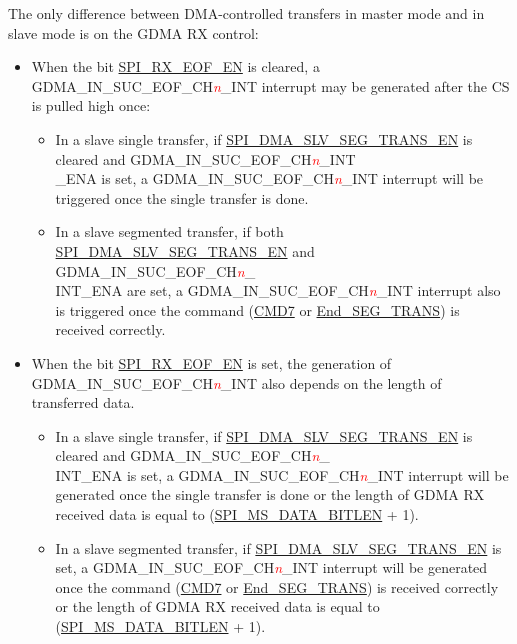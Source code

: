 \documentclass[main\_\_EN.tex]{subfiles}
\begin{document}
The only difference between DMA-controlled transfers in master mode and in slave mode is on the GDMA RX control:

\begin{itemize}
    \item When the bit \hyperref[fielddesc:SPIRXEOFEN]{SPI\_RX\_EOF\_EN} is cleared, a GDMA\_IN\_SUC\_EOF\_CH\textcolor{red}{\it{n}}\_INT interrupt may be generated after the CS is pulled high once:
        \begin{itemize}
            \item In a slave single transfer, if \hyperref[fielddesc:SPIDMASLVSEGTRANSEN]{SPI\_DMA\_SLV\_SEG\_TRANS\_EN} is cleared and GDMA\_IN\_SUC\_EOF\_CH\textcolor{red}{\it{n}}\_INT\\\_ENA is set, a GDMA\_IN\_SUC\_EOF\_CH\textcolor{red}{\it{n}}\_INT interrupt will be triggered once the single transfer is done.
            \item In a slave segmented transfer, if both \hyperref[fielddesc:SPIDMASLVSEGTRANSEN]{SPI\_DMA\_SLV\_SEG\_TRANS\_EN} and GDMA\_IN\_SUC\_EOF\_CH\textcolor{red}{\it{n}}\_\\INT\_ENA are set, a GDMA\_IN\_SUC\_EOF\_CH\textcolor{red}{\it{n}}\_INT interrupt also is triggered once the command (\hyperref[other:spi-item-cmd7]{CMD7} or \hyperref[other:spi-item-end-seg-trans]{End\_SEG\_TRANS}) is received correctly.
        \end{itemize}

    \item When the bit \hyperref[fielddesc:SPIRXEOFEN]{SPI\_RX\_EOF\_EN} is set, the generation of GDMA\_IN\_SUC\_EOF\_CH\textcolor{red}{\it{n}}\_INT also depends on the length of transferred data.
        \begin{itemize}
            \item In a slave single transfer, if \hyperref[fielddesc:SPIDMASLVSEGTRANSEN]{SPI\_DMA\_SLV\_SEG\_TRANS\_EN} is cleared and GDMA\_IN\_SUC\_EOF\_CH\textcolor{red}{\it{n}}\_\\INT\_ENA is set, a GDMA\_IN\_SUC\_EOF\_CH\textcolor{red}{\it{n}}\_INT interrupt will be generated once the single transfer is done or the length of GDMA RX received data is equal to (\hyperref[fielddesc:SPIMSDATABITLEN]{SPI\_MS\_DATA\_BITLEN} + 1).
            \item In a slave segmented transfer, if \hyperref[fielddesc:SPIDMASLVSEGTRANSEN]{SPI\_DMA\_SLV\_SEG\_TRANS\_EN} is set, a GDMA\_IN\_SUC\_EOF\_CH\textcolor{red}{\it{n}}\_INT interrupt will be generated once the command (\hyperref[other:spi-item-cmd7]{CMD7} or \hyperref[other:spi-item-end-seg-trans]{End\_SEG\_TRANS}) is received correctly or the length of GDMA RX received data is equal to (\hyperref[fielddesc:SPIMSDATABITLEN]{SPI\_MS\_DATA\_BITLEN} + 1).
            \end{itemize}
\end{itemize}
\end{document}
